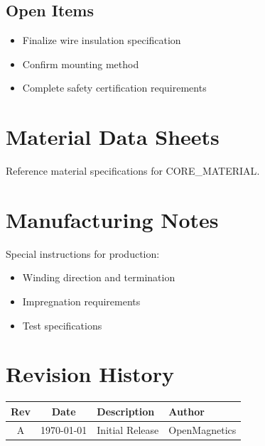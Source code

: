 \documentclass[11pt,a4paper]{article}
\begin{document}
\subsection{Open Items}
\begin{itemize}
    \item Finalize wire insulation specification
    \item Confirm mounting method
    \item Complete safety certification requirements
\end{itemize}

\appendix

\section{Material Data Sheets}
Reference material specifications for {{CORE_MATERIAL}}.

\section{Manufacturing Notes}
Special instructions for production:
\begin{itemize}
    \item Winding direction and termination
    \item Impregnation requirements
    \item Test specifications
\end{itemize}

\section{Revision History}
\begin{longtable}{|c|c|l|l|}
\hline
\textbf{Rev} & \textbf{Date} & \textbf{Description} & \textbf{Author} \\
\hline
A & \today & Initial Release & OpenMagnetics \\
\hline
\end{longtable}
\end{document}
